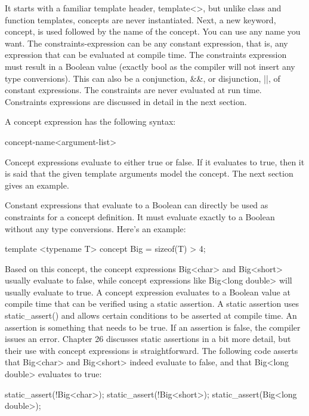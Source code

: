 It starts with a familiar template header, template<>, but unlike class and function templates, concepts are never instantiated. Next, a new keyword, concept, is used followed by the name of the concept. You can use any name you want. The constraints-expression can be any constant expression, that is, any expression that can be evaluated at compile time. The constraints expression must result in a Boolean value (exactly bool as the compiler will not insert any type conversions). This can also be a conjunction, \&\&, or disjunction, ||, of constant expressions. The constraints are never evaluated at run time. Constraints expressions are discussed in detail in the next section.

A concept expression has the following syntax:

\begin{cpp}
concept-name<argument-list>
\end{cpp}

Concept expressions evaluate to either true or false. If it evaluates to true, then it is said that the given template arguments model the concept. The next section gives an example.


Constant expressions that evaluate to a Boolean can directly be used as constraints for a concept definition. It must evaluate exactly to a Boolean without any type conversions. Here’s an example:

\begin{cpp}
template <typename T>
concept Big = sizeof(T) > 4;
\end{cpp}

Based on this concept, the concept expressions Big<char> and Big<short> usually evaluate to false, while concept expressions like Big<long double> will usually evaluate to true. A concept expression evaluates to a Boolean value at compile time that can be verified using a static assertion. A static assertion uses static\_assert() and allows certain conditions to be asserted at compile time. An assertion is something that needs to be true. If an assertion is false, the compiler issues an error. Chapter 26 discusses static assertions in a bit more detail, but their use with concept expressions is straightforward. The following code asserts that Big<char> and Big<short> indeed evaluate to false, and that Big<long double> evaluates to true:

\begin{cpp}
static_assert(!Big<char>);
static_assert(!Big<short>);
static_assert(Big<long double>);
\end{cpp}

